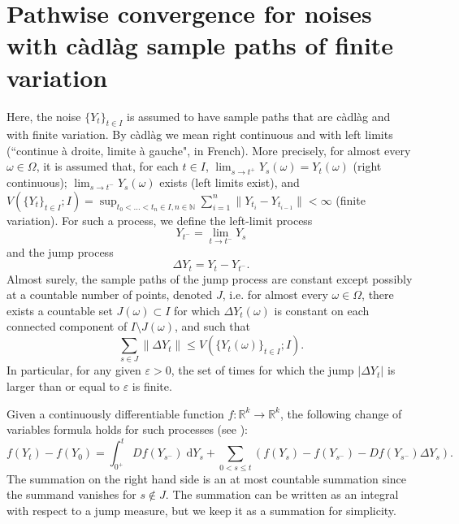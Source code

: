 \documentclass[reqno,12pt]{amsart}
\theoremstyle{plain} %
\theoremstyle{definition} %
\begin{document}
\section{Pathwise convergence for noises with c\`adl\`ag sample paths of finite variation}
\label{secmonotonicbound}

Here, the noise $\{Y_t\}_{t\in I}$ is assumed to have sample paths that are c\`adl\`ag and with finite variation. By c\`adl\`ag we mean right continuous and with left limits (``continue \`a droite, limite \`a gauche", in French). More precisely, for almost every $\omega\in \Omega$, it is assumed that, for each $t\in I$, $\lim_{s\rightarrow t^+} Y_s(\omega) = Y_t(\omega)$ (right continuous); $\lim_{s \rightarrow t^-} Y_s(\omega)$ exists (left limits exist), and $V(\{Y_t\}_{t\in I}; I) = \sup_{t_0 < \ldots < t_n \in I, n\in \mathbb{N}} \sum_{i=1}^n \|Y_{t_i} - Y_{t_{i-1}}\| < \infty$ (finite variation). For such a process, we define the left-limit process
\begin{equation}
  Y_{t^{-}} = \lim_{t \rightarrow t^-} Y_s
\end{equation}
and the jump process
\begin{equation}
  \Delta Y_t = Y_t - Y_{t^{-}}.
\end{equation}
Almost surely, the sample paths of the jump process are constant except possibly at a countable number of points, denoted $J$, i.e. for almost every $\omega\in \Omega$, there exists a countable set $J(\omega) \subset I$ for which $\Delta Y_t(\omega)$ is constant on each connected component of $I\setminus J(\omega)$, and such that
\[
    \sum_{s\in J} \|\Delta Y_t\| \leq V(\{Y_t(\omega)\}_{t\in I}; I).
\]
In particular, for any given $\varepsilon > 0$, the set of times for which the jump $|\Delta Y_t|$ is larger than or equal to $\varepsilon$ is finite.

Given a continuously differentiable function $f:\mathbb{R}^k \rightarrow \mathbb{R}^k$, the following change of variables formula holds for such processes (see \cite[Theorems 31 and 33]{Protter2005}):
\begin{equation}
    f(Y_t) - f(Y_0) = \int_{0^+}^t Df(Y_{s^-}) \;\mathrm{d}Y_s + \sum_{0 < s \leq t} \left( f(Y_s) - f(Y_{s^{-}}) - Df(Y_{s^-})\Delta Y_s\right).
\end{equation}
The summation on the right hand side is an at most countable summation since the summand vanishes for $s \notin J$. The summation can be written as an integral with respect to a jump measure, but we keep it as a summation for simplicity.
\end{document}
